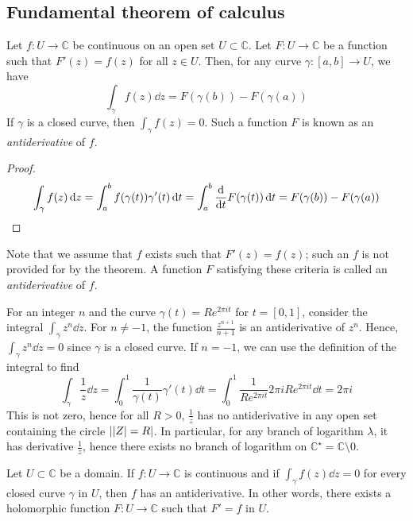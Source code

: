 \subsection{Fundamental theorem of calculus}
\begin{theorem}
	Let \( f \colon U \to \mathbb C \) be continuous on an open set \( U \subset \mathbb C \).
	Let \( F \colon U \to \mathbb C \) be a function such that \( F'(z) = f(z) \) for all \( z \in U \).
	Then, for any curve \( \gamma \colon [a,b] \to U \), we have
	\[ \int_\gamma f(z) \dd{z} = F(\gamma(b)) - F(\gamma(a)) \]
	If \( \gamma \) is a closed curve, then \( \int_\gamma f(z) = 0 \).
	Such a function \( F \) is known as an \textit{antiderivative} of \( f \).
\end{theorem}
\begin{proof}
	\[ \int_\gamma f(z) \dd{z} = \int_a^b f(\gamma(t)) \gamma'(t) \dd{t} = \int_a^b \dv{t} F(\gamma(t)) \dd{t} = F(\gamma(b)) - F(\gamma(a)) \]
\end{proof}
\begin{remark}
	Note that we assume that \( f \) exists such that \( F'(z) = f(z) \); such an \( f \) is not provided for by the theorem.
	A function \( F \) satisfying these criteria is called an \textit{antiderivative} of \( f \).
\end{remark}
\begin{example}
	For an integer \( n \) and the curve \( \gamma(t) = Re^{2\pi it} \) for \( t = [0,1] \), consider the integral \( \int_\gamma z^n \dd{z} \).
	For \( n \neq -1 \), the function \( \frac{z^{n+1}}{n+1} \) is an antiderivative of \( z^n \).
	Hence, \( \int_\gamma z^n \dd{z} = 0 \) since \( \gamma \) is a closed curve.
	If \( n = -1 \), we can use the definition of the integral to find
	\[ \int_\gamma \frac{1}{z} \dd{z} = \int_0^1 \frac{1}{\gamma(t)} \gamma'(t) \dd{t} = \int_0^1 \frac{1}{Re^{2\pi i t}}2\pi i R e^{2 \pi i t} \dd{t} = 2 \pi i \]
	This is not zero, hence for all \( R > 0 \), \( \frac{1}{z} \) has no antiderivative in any open set containing the circle \( \abs{\abs{Z} = R} \).
	In particular, for any branch of logarithm \( \lambda \), it has derivative \( \frac{1}{z} \), hence there exists no branch of logarithm on \( \mathbb C^\star = \mathbb C \setminus \qty{0} \).
\end{example}
\begin{theorem}
	Let \( U \subset \mathbb C \) be a domain.
	If \( f \colon U \to \mathbb C \) is continuous and if \( \int_\gamma f(z) \dd{z} = 0 \) for every closed curve \( \gamma \) in \( U \), then \( f \) has an antiderivative.
	In other words, there exists a holomorphic function \( F \colon U \to \mathbb C \) such that \( F' = f \) in \( U \).
\end{theorem}
